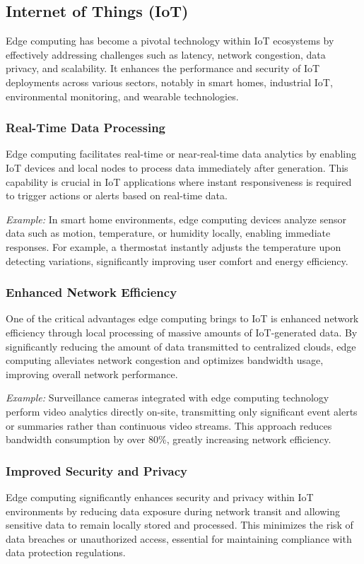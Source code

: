 \documentclass[runningheads]{llncs}
\begin{document}
\subsection{Internet of Things (IoT)}

Edge computing has become a pivotal technology within IoT ecosystems by effectively addressing challenges such as latency, network congestion, data privacy, and scalability. It enhances the performance and security of IoT deployments across various sectors, notably in smart homes, industrial IoT, environmental monitoring, and wearable technologies.

\subsubsection{Real-Time Data Processing}
Edge computing facilitates real-time or near-real-time data analytics by enabling IoT devices and local nodes to process data immediately after generation. This capability is crucial in IoT applications where instant responsiveness is required to trigger actions or alerts based on real-time data.

\noindent\textit{Example:} In smart home environments, edge computing devices analyze sensor data such as motion, temperature, or humidity locally, enabling immediate responses. For example, a thermostat instantly adjusts the temperature upon detecting variations, significantly improving user comfort and energy efficiency.

\subsubsection{Enhanced Network Efficiency}
One of the critical advantages edge computing brings to IoT is enhanced network efficiency through local processing of massive amounts of IoT-generated data. By significantly reducing the amount of data transmitted to centralized clouds, edge computing alleviates network congestion and optimizes bandwidth usage, improving overall network performance.

\noindent\textit{Example:} Surveillance cameras integrated with edge computing technology perform video analytics directly on-site, transmitting only significant event alerts or summaries rather than continuous video streams. This approach reduces bandwidth consumption by over 80\%, greatly increasing network efficiency.

\subsubsection{Improved Security and Privacy}
Edge computing significantly enhances security and privacy within IoT environments by reducing data exposure during network transit and allowing sensitive data to remain locally stored and processed. This minimizes the risk of data breaches or unauthorized access, essential for maintaining compliance with data protection regulations.
\end{document}
